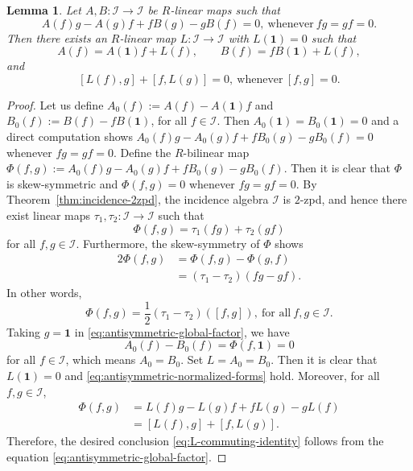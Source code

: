 \documentclass[reqno]{amsart}
\numberwithin{equation}{section}
\theoremstyle{plain}
\newtheorem{lemma}[theorem]{Lemma}
\theoremstyle{definition}
\newcommand{\I}{\mathcal I}
\newcommand{\one}{\mathbf 1}
\begin{document}
\begin{lemma}\label{lem:antisymmetric-reduction}
Let $A,B:\I\to\I$ be $R$-linear maps such that
\begin{equation}\label{eq:antisymmetric-local}
A(f)g-A(g)f+fB(g)-gB(f)=0,~\text{whenever}~fg=gf=0.
\end{equation}
Then there exists an $R$-linear map $L:\I\to\I$ with
$L(\one)=0$ such that
\begin{equation}\label{eq:antisymmetric-normalized-forms}
A(f)=A(\one)f+L(f),
\qquad
B(f)=fB(\one)+L(f),
\end{equation}
and
\begin{equation}\label{eq:L-commuting-identity}
[L(f),g]+[f,L(g)]=0,~\text{whenever}~[f,g]=0.
\end{equation}
\end{lemma}

\begin{proof}
Let us define $A_0(f):=A(f)-A(\one)f$ and $B_0(f):=B(f)-fB(\one)$, for all $f\in\I$.
Then $A_0(\one)=B_0(\one)=0$ and a direct computation shows $A_0(f)g-A_0(g)f+fB_0(g)-gB_0(f)=0$ whenever $fg=gf=0$.
Define the $R$-bilinear map $\Phi(f,g):=A_0(f)g-A_0(g)f+fB_0(g)-gB_0(f)$.
Then it is clear that $\Phi$ is skew-symmetric and $\Phi(f,g)=0$ whenever $fg=gf=0$.
By Theorem~\ref{thm:incidence-2zpd}, the incidence algebra $\I$ is $2$-zpd, and hence there exist linear maps
$\tau_1,\tau_2:\I \to \I$ such that
\[
\Phi(f,g)=\tau_1(fg)+\tau_2(gf)
\]
for all $f,g\in \I$. Furthermore, the skew-symmetry of $\Phi$ shows
\[
\begin{aligned}
2\Phi(f,g)
&=\Phi(f,g)-\Phi(g,f)\\
&=(\tau_1-\tau_2)(fg-gf).
\end{aligned}
\]
In other words,
\begin{equation}\label{eq:antisymmetric-global-factor}
\Phi(f,g)=\frac{1}{2}(\tau_1-\tau_2)([f,g]), ~\text{for~all}~f,g\in\I.
\end{equation}
Taking $g=\one$ in \eqref{eq:antisymmetric-global-factor}, we have
$$A_0(f)-B_0(f)=\Phi(f,\one)=0$$
for all $f\in \I$, which means $A_0=B_0$. Set $L=A_0=B_0$. Then it is clear that $L(\one)=0$ and
\eqref{eq:antisymmetric-normalized-forms} hold.
Moreover, for all $f,g\in \I$,
\[
\begin{aligned}
\Phi(f,g)
&=L(f)g-L(g)f+fL(g)-gL(f)\\
&=[L(f),g]+[f,L(g)].
\end{aligned}
\]
Therefore, the desired conclusion \eqref{eq:L-commuting-identity}
follows from the equation \eqref{eq:antisymmetric-global-factor}.
\end{proof}
\end{document}
